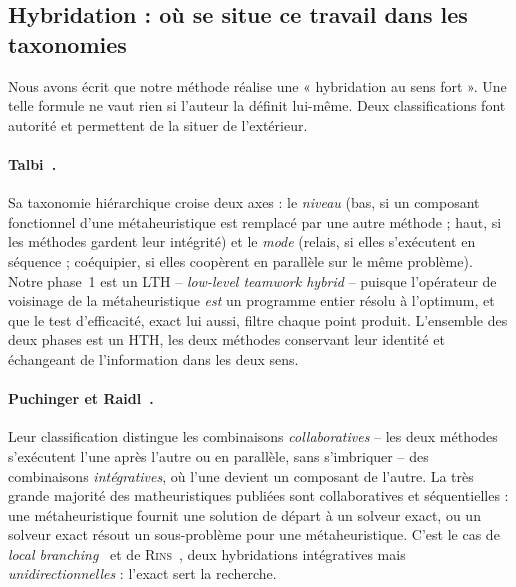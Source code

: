 \documentclass[11pt,a4paper]{article}
\theoremstyle{plain}
\theoremstyle{remark}
\begin{document}
\subsection{Hybridation : où se situe ce travail dans les taxonomies}
\label{sec:taxonomie}

Nous avons écrit que notre méthode réalise une « hybridation au sens fort ».
Une telle formule ne vaut rien si l'auteur la définit lui-même. Deux
classifications font autorité et permettent de la situer de l'extérieur.

\paragraph{Talbi~\cite{talbi2002}.} Sa taxonomie hiérarchique croise deux
axes : le \emph{niveau} (bas, si un composant fonctionnel d'une
métaheuristique est remplacé par une autre méthode ; haut, si les méthodes
gardent leur intégrité) et le \emph{mode} (relais, si elles s'exécutent en
séquence ; coéquipier, si elles coopèrent en parallèle sur le même
problème). Notre phase~1 est un \textsf{LTH} -- \emph{low-level teamwork
hybrid} -- puisque l'opérateur de voisinage de la métaheuristique \emph{est}
un programme entier résolu à l'optimum, et que le test d'efficacité, exact
lui aussi, filtre chaque point produit. L'ensemble des deux phases est un
\textsf{HTH}, les deux méthodes conservant leur identité et échangeant de
l'information dans les deux sens.

\paragraph{Puchinger et Raidl~\cite{puchinger2005}.} Leur classification
distingue les combinaisons \emph{collaboratives} -- les deux méthodes
s'exécutent l'une après l'autre ou en parallèle, sans s'imbriquer -- des
combinaisons \emph{intégratives}, où l'une devient un composant de l'autre.
La très grande majorité des matheuristiques publiées sont collaboratives et
séquentielles : une métaheuristique fournit une solution de départ à un
solveur exact, ou un solveur exact résout un sous-problème pour une
métaheuristique. C'est le cas de \emph{local branching}~\cite{fischetti2003}
et de \textsc{Rins}~\cite{danna2005}, deux hybridations intégratives mais
\emph{unidirectionnelles} : l'exact sert la recherche.
\end{document}
